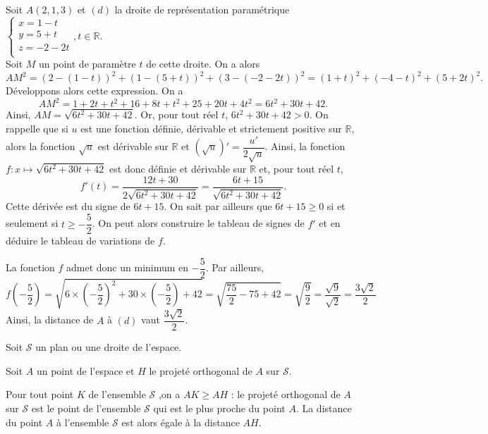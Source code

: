 \documentclass[11pt,fleqn, openany]{book} %
\begin{document}
\begin{example}Soit $A(2,1,3)$ et $(d)$ la droite de représentation paramétrique $\left\{ \begin{array}{l}x=1-t \\ y=5+t \\ z = -2-2t \\\end{array}\right., t \in \mathbb{R}$. \\Soit $M$ un point de paramètre $t$ de cette droite. On a alors
\[AM^2=(2-(1-t))^2+(1-(5+t))^2+(3-(-2-2t))^2=(1+t)^2+(-4-t)^2+(5+2t)^2.\]
Développons alors cette expression. On a
\[AM^2=1+2t+t^2+16+8t+t^2+25+20t+4t^2=6t^2+30t+42.\]
Ainsi, $AM=\sqrt{6t^2+30t+42}$. Or, pour tout réel $t$, $6t^2+30t+42>0$. On rappelle que si $u$ est une fonction définie, dérivable et strictement positive sur $\mathbb{R}$, alors la fonction $\sqrt{u}$ est dérivable sur $\mathbb{R}$ et $(\sqrt{u})'=\dfrac{u'}{2\sqrt{u}}$. Ainsi, la fonction $f:x\mapsto \sqrt{6t^2+30t+42}$ est donc définie et dérivable sur $\mathbb{R}$ et, pour tout réel $t$, 
\[f'(t)= \dfrac{12t+30}{2\sqrt{6t^2+30t+42}}=\dfrac{6t+15}{\sqrt{6t^2+30t+42}}.\]
Cette dérivée est du signe de $6t+15$. On sait par ailleurs que $6t+15\geqslant 0$ si et seulement si $t \geqslant - \dfrac{5}{2}$. On peut alors construire le tableau de signes de $f'$ et en déduire le tableau de variations de $f$.

\begin{center}
\end{center}

La fonction $f$ admet donc un minimum en $-\dfrac{5}{2}$. Par ailleurs,
\[f\left(-\dfrac{5}{2}\right)=\sqrt{6\times \left(-\dfrac{5}{2}\right)^2+30\times \left(-\dfrac{5}{2}\right)+42}=\sqrt{\dfrac{75}{2}-75+42}=\sqrt{\dfrac{9}{2}}=\dfrac{\sqrt{9}}{\sqrt{2}}=\dfrac{3\sqrt{2}}{2}\]
Ainsi, la distance de $A$ à $(d)$ vaut $\dfrac{3\sqrt{2}}{2}$.

\end{example}

\begin{proposition}Soit $\mathcal{S}$ un plan ou une droite de l'espace.

Soit $A$ un point de l'espace et $H$ le projeté orthogonal de $A$ sur $\mathcal{S}$.

Pour tout point $K$ de l'ensemble $\mathcal{S}$ ,on a $AK \geqslant AH$ : le projeté orthogonal de $A$ sur $\mathcal{S}$ est le point de l'ensemble $\mathcal{S}$ qui est le plus proche du point $A$. La distance du point $A$ à l'ensemble $\mathcal{S}$ est alors égale à la distance $AH$.\end{proposition}
\end{document}
